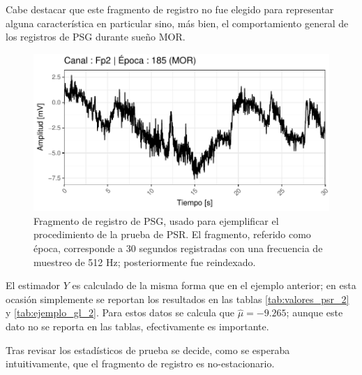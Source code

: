 \documentclass[12pt,letterpaper]{book}
\begin{document}
Cabe destacar que este fragmento de registro no fue elegido para representar alguna característica en particular sino, 
más bien, el comportamiento general de los registros de PSG durante sueño MOR.

\begin{figure}
\centering
\includegraphics[width=.9\linewidth]{./scripts_graf_res/psg.pdf}
\caption[Fragmento de registro de PSG, usado para ejemplificar la prueba de PSR.]{Fragmento de registro de PSG, usado para ejemplificar el procedimiento de la prueba de PSR.
El fragmento, referido como época, corresponde a 30 segundos registradas con una frecuencia de muestreo de 512 Hz; posteriormente fue reindexado.}
\label{fig:lazy22}
\end{figure}

El estimador $Y$ es calculado de la misma forma que en el ejemplo anterior; en esta ocasión simplemente se reportan los resultados en las tablas \ref{tab:valores_psr_2} y \ref{tab:ejemplo_gl_2}.
%
Para estos datos se calcula que $\widehat{\mu} = -9.265$; aunque este dato no se reporta en las tablas, efectivamente es importante. 

Tras revisar los estadísticos de prueba se decide, como se esperaba intuitivamente, que el fragmento de registro es no-estacionario.
%
\end{document}
